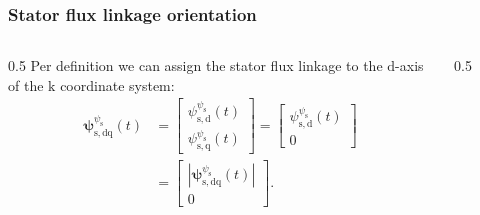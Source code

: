 \begin{frame}
    \frametitle{Stator flux linkage orientation}
    \begin{columns}
        \begin{column}{0.5\textwidth}
            Per definition we can assign the stator flux linkage to the $\mathrm{d}$-axis of the $\mathrm{k}$ coordinate system:
            \begin{equation}
                \renewcommand{\arraystretch}{1.4}
                \begin{split}
                    \bm{\psi}^{\psi_{\mathrm{s}}}_\mathrm{s,dq}(t) & = \begin{bmatrix} \psi_{\mathrm{s,d}}^{\psi_{\mathrm{s}}}(t) \\ \psi_{\mathrm{s,q}}^{\psi_{\mathrm{s}}}(t) \end{bmatrix} = \begin{bmatrix} \psi_{\mathrm{s,d}}^{\psi_{\mathrm{s}}}(t) \\ 0 \end{bmatrix} \\
                                                                   & = \begin{bmatrix}|\bm{\psi}^{\psi_{\mathrm{s}}}_\mathrm{s,dq}(t)| \\ 0 \end{bmatrix}.
                \end{split}
                \label{eq:IM_model_k_stator_flux_orientation_def}
            \end{equation}
        \end{column}
        \begin{column}{0.5\textwidth}
            \begin{figure}
                \centering
                \begin{tikzpicture}[>=Latex]


\end{tikzpicture}
\end{figure}
\end{column}
\end{columns}
\end{frame}
